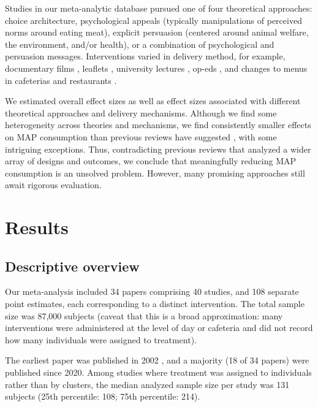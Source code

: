 \documentclass[sn-nature,referee,pdflatex]{sn-jnl}
\begin{document}
Studies in our meta-analytic database pursued one of four theoretical
approaches: choice architecture, psychological appeals (typically
manipulations of perceived norms around eating meat), explicit
persuasion (centered around animal welfare, the environment, and/or
health), or a combination of psychological and persuasion messages.
Interventions varied in delivery method, for example, documentary films
\citep{mathur2021effectiveness}, leaflets \citep{peacock2017},
university lectures \citep{jalil2023}, op-eds \citep{haile2021}, and
changes to menus in cafeterias \citep{andersson2021} and restaurants
\citep{coker2022, sparkman2021}.

We estimated overall effect sizes as well as effect sizes associated
with different theoretical approaches and delivery mechanisms. Although
we find some heterogeneity across theories and mechanisms, we find
consistently smaller effects on MAP consumption than previous reviews
have suggested
\citep{bianchi2018restructuring, byerly2018, chang2023, harguess2020, kwasny2022, mathur2021meta, meier2022, pandey2023},
with some intriguing exceptions. Thus, contradicting previous reviews
that analyzed a wider array of designs and outcomes, we conclude that
meaningfully reducing MAP consumption is an unsolved problem. However,
many promising approaches still await rigorous evaluation.

\section{Results}\label{sec2}

\subsection{Descriptive overview}\label{sec2.1}

Our meta-analysis included 34 papers comprising 40 studies, and 108
separate point estimates, each corresponding to a distinct intervention.
The total sample size was 87,000 subjects (caveat that this is a broad
approximation: many interventions were administered at the level of day
or cafeteria and did not record how many individuals were assigned to
treatment).

The earliest paper was published in 2002 \citep{allen2002}, and a
majority (18 of 34 papers) were published since 2020. Among studies
where treatment was assigned to individuals rather than by clusters, the
median analyzed sample size per study was 131 subjects (25th percentile:
108; 75th percentile: 214).
\end{document}

